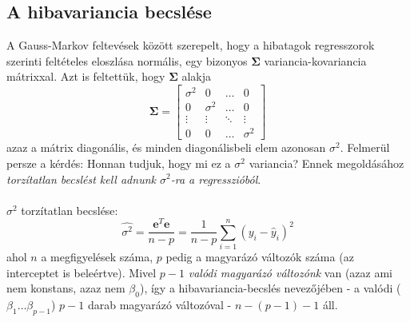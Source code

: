 \documentclass[14p]{report}
\def\pmb{\boldsymbol}
\newcounter{x}
\newcounter{y}
\newcounter{z}
\begin{document}
	\subsection{A hibavariancia becslése}
	A Gauss-Markov feltevések között szerepelt, hogy a hibatagok regresszorok szerinti feltételes eloszlása normális, egy bizonyos $\pmb{\Sigma}$ variancia-kovariancia mátrixxal. Azt is feltettük, hogy $\pmb{\Sigma}$ alakja
	\[
	\pmb{\Sigma} =
	\begin{bmatrix}
		\sigma^2 & 0 & \dots & 0 \\
		0 & \sigma^2 & \dots & 0 \\
		\vdots & \vdots & \ddots & \vdots \\
		0 & 0 & \dots & \sigma^2
	\end{bmatrix}
	\]
	azaz a mátrix diagonális, és minden diagonálisbeli elem azonosan $\sigma^2$. Felmerül persze a kérdés: Honnan tudjuk, hogy mi ez a $\sigma^2$ variancia? Ennek megoldásához \emph{torzítatlan becslést kell adnunk $\sigma^2$-ra a regresszióból}.
	\\
	\\
	$\sigma^2$ torzítatlan becslése:
	\[
	\widehat{\sigma^2} = \frac{\pmb{e}^T\pmb{e}}{n-p} = \frac{1}{n-p}\sum_{i=1}^{n}{(y_i - \hat{y}_i)^2}
	\]
	ahol $n$ a megfigyelések száma, $p$ pedig a magyarázó változók száma (az interceptet is beleértve). Mivel $p-1$ \emph{valódi magyarázó változónk} van (azaz ami nem konstans, azaz nem $\beta_0$), így a hibavariancia-becslés nevezőjében - a valódi ($\beta_1 \dots \beta_{p-1}$) $p-1$ darab magyarázó változóval - $n-(p-1)-1$ áll.
	
\end{document}
